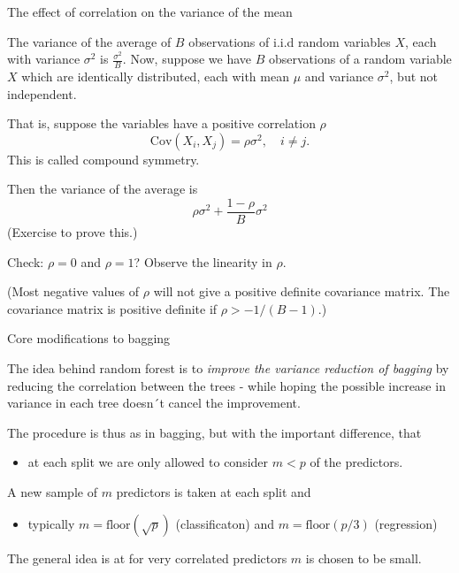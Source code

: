 \documentclass[
  ignorenonframetext,
]{beamer}
\providecommand{\tightlist}{%
  \setlength{\itemsep}{0pt}\setlength{\parskip}{0pt}}
\begin{document}
\begin{frame}

\begin{block}{The effect of correlation on the variance of the mean}

The variance of the average of \(B\) observations of i.i.d random
variables \(X\), each with variance \(\sigma^2\) is
\(\frac{\sigma^2}{B}\). Now, suppose we have \(B\) observations of a
random variable \(X\) which are identically distributed, each with mean
\(\mu\) and variance \(\sigma^2\), but not independent.

That is, suppose the variables have a positive correlation \(\rho\)
\[\text{Cov}(X_i, X_j) = \rho \sigma^2, \quad i \neq j.\] This is called
compound symmetry.

Then the variance of the average is
\[\rho \sigma^2+\frac{1-\rho}{B} \sigma^2\] (Exercise to prove this.)

\end{block}

\end{frame}

\begin{frame}

Check: \(\rho=0\) and \(\rho=1\)? Observe the linearity in \(\rho\).

(Most negative values of \(\rho\) will not give a positive definite
covariance matrix. The covariance matrix is positive definite if
\(\rho>-1/(B-1)\).)

\end{frame}

\begin{frame}

\begin{block}{Core modifications to bagging}

The idea behind random forest is to \emph{improve the variance reduction
of bagging} by reducing the correlation between the trees - while hoping
the possible increase in variance in each tree doesn´t cancel the
improvement.

The procedure is thus as in bagging, but with the important difference,
that

\begin{itemize}
\tightlist
\item
  at each split we are only allowed to consider \(m<p\) of the
  predictors.
\end{itemize}

A new sample of \(m\) predictors is taken at each split and

\begin{itemize}
\tightlist
\item
  typically \(m= \text{floor}(\sqrt p)\) (classificaton) and
  \(m=\text{floor}(p/3)\) (regression)
\end{itemize}

The general idea is at for very correlated predictors \(m\) is chosen to
be small.

\end{block}

\end{frame}
\end{document}
